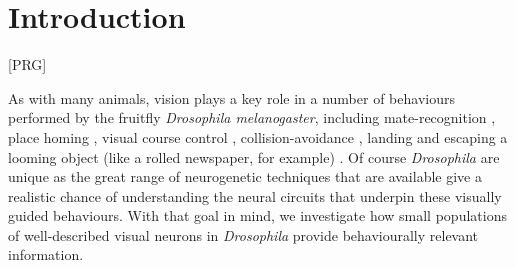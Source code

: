 \section*{Introduction}
[PRG]

As with many animals, vision plays a key role in a number of behaviours performed by the fruitfly \emph{Drosophila melanogaster}, including mate-recognition \cite{Agrawal2014}, place homing \cite{Ofstad2011}, visual course control \cite{Borst2014}, collision-avoidance \cite{Tammero2002}, landing \cite{Tammero2002} and escaping a looming object (like a rolled newspaper, for example) \cite{Card2008}.
Of course \emph{Drosophila} are unique as the great range of neurogenetic techniques that are available give a realistic chance of understanding the neural circuits that underpin these visually guided behaviours. With that goal in mind, we investigate how small populations of well-described visual neurons in \emph{Drosophila} provide behaviourally relevant information.


